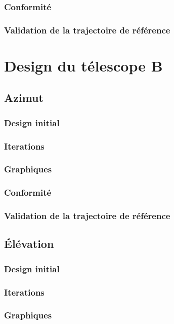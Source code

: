 \documentclass{udes_rapport} %
\begin{document}
\subsubsection{Conformité}
\subsubsection{Validation de la trajectoire de référence}
\section{Design du télescope B}
\subsection{Azimut}
\subsubsection{Design initial}
\subsubsection{Iterations}
\subsubsection{Graphiques}
\subsubsection{Conformité}
\subsubsection{Validation de la trajectoire de référence}
\subsection{Élévation}
\subsubsection{Design initial}
\subsubsection{Iterations}
\subsubsection{Graphiques}
\end{document}
